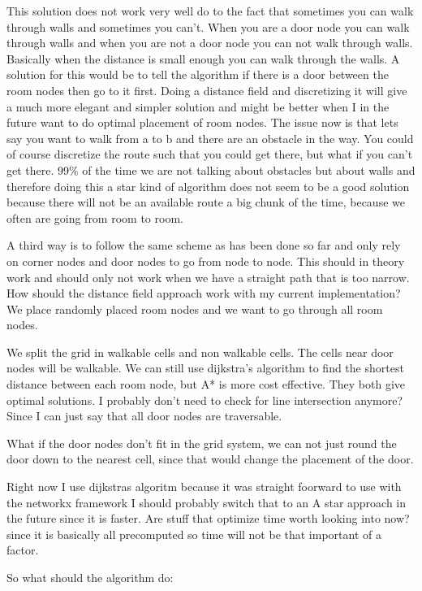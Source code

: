This solution does not work very well do to the fact that sometimes you can walk through walls and sometimes you can't. When you are a door node you can walk through walls and when you are not a door node you can not walk through walls. Basically when the distance is small enough you can walk through the walls.
A solution for this would be to tell the algorithm if there is a door between the room nodes then go to it first.
Doing a distance field and discretizing it will give a much more elegant and simpler solution and might be better when I in the future want to do optimal placement of room nodes.
The issue now is that lets say you want to walk from a to b and there are an obstacle in the way. You could of course discretize the route such that you could get there, but what if you can't get there.
99\% of the time we are not talking about obstacles but about walls and therefore doing this a star kind of algorithm does not seem to be a good solution because there will not be an available route a big chunk of the time, because we often are going from room to room. 

A third way is to follow the same scheme as has been done so far and only rely on corner nodes and door nodes to go from node to node. This should in theory work and should only not work when we have a straight path that is too narrow. 
How should the distance field approach work with my current implementation?
We place randomly placed room nodes and we want to go through all room nodes. 

We split the grid in walkable cells and non walkable cells. The cells near door nodes will be walkable.
We can still use dijkstra's algorithm to find the shortest distance between each room node, but A* is more cost effective.
They both give optimal solutions.
I probably don't need to check for line intersection anymore? Since I can just say that all door nodes are traversable.

What if the door nodes don't fit in the grid system, we can not just round the door down to the nearest cell, since that would change the placement of the door.

Right now I use dijkstras algoritm because it was straight foorward to use with the networkx framework
I should probably switch that to an A star approach in the future since it is faster. Are stuff that optimize time worth looking into now? since it is basically all precomputed so 
time will not be that important of a factor.



So what should the algorithm do:

